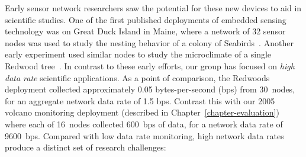 Early sensor network researchers saw the potential for these new devices to
aid in scientific studies. One of the first published deployments of embedded
sensing technology was on Great Duck Island in Maine, where a network of 32
sensor nodes was used to study the nesting behavior of a colony of
Seabirds~\cite{gdi-sensys04}. Another early experiment used similar nodes to
study the microclimate of a single Redwood tree~\cite{berkeley-redwoods}.  In
contrast to these early efforts, our group has focused on \textit{high
data rate} scientific applications. As a point of comparison, the Redwoods
deployment collected approximately 0.05 bytes-per-second (bps) from 30~nodes,
for an aggregate network data rate of 1.5 bps. Contrast this with our 2005
volcano monitoring deployment (described in Chapter~\ref{chapter-evaluation})
where each of 16~nodes collected 600~bps of data, for a network data rate of
9600~bps. Compared with low data rate monitoring, high network data rates
produce a distinct set of research challenges:

